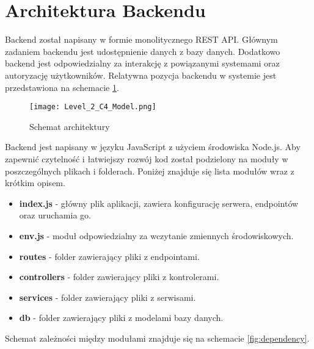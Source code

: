 \documentclass{documentation}
\begin{document}
\section{Architektura Backendu}

Backend został napisany w formie monolitycznego REST API.
Głównym zadaniem backendu jest udostępnienie danych z bazy danych.
Dodatkowo backend jest odpowiedzialny za interakcję z powiązanymi systemami oraz autoryzację użytkowników.
Relatywna pozycja backendu w systemie jest przedstawiona na schemacie \ref{fig:arch}.

\begin{figure}[h]
    \centering
    \texttt{[image: Level\_2\_C4\_Model.png]}
    \caption{Schemat architektury\label{fig:arch}}
\end{figure}

Backend jest napisany w języku JavaScript z użyciem środowiska Node.js.
Aby zapewnić czytelność i łatwiejszy rozwój kod został podzielony na moduły w poszczególnych plikach i folderach.
Poniżej znajduje się lista modułów wraz z krótkim opisem.

\begin{itemize}
    \item \textbf{index.js} - główny plik aplikacji, zawiera konfigurację serwera, endpointów oraz uruchamia go.
    \item \textbf{env.js} - moduł odpowiedzialny za wczytanie zmiennych środowiskowych.
    \item \textbf{routes} - folder zawierający pliki z endpointami.
    \item \textbf{controllers} - folder zawierający pliki z kontrolerami.
    \item \textbf{services} - folder zawierający pliki z serwisami.
    \item \textbf{db} - folder zawierający pliki z modelami bazy danych.
\end{itemize}

Schemat zależności między modułami znajduje się na schemacie \ref{fig:dependency}.
\end{document}
